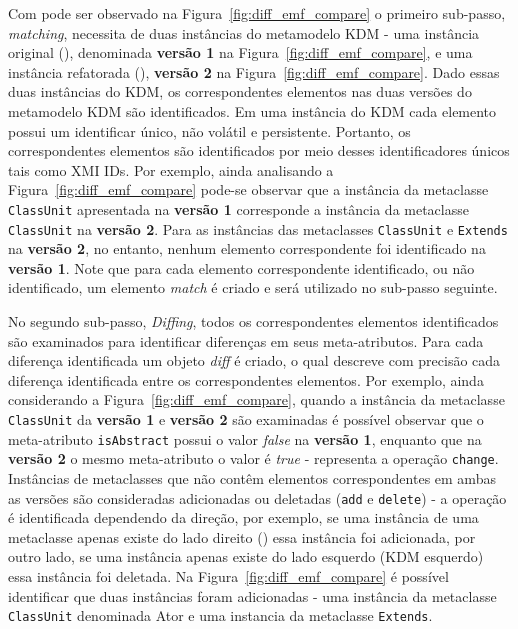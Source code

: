 Com pode ser observado na Figura~\ref{fig:diff_emf_compare} o primeiro sub-passo, \textit{matching}, necessita de duas instâncias do metamodelo KDM - uma instância original (), denominada \textbf{versão 1} na Figura~\ref{fig:diff_emf_compare}, e uma instância refatorada (), \textbf{versão 2} na Figura~\ref{fig:diff_emf_compare}. Dado essas duas instâncias do KDM, os correspondentes elementos nas duas versões do metamodelo KDM são identificados. Em uma instância do KDM cada elemento possui um identificar único, não volátil e persistente. Portanto, os correspondentes elementos são identificados por meio desses identificadores únicos tais como XMI IDs. Por exemplo, ainda analisando a Figura~\ref{fig:diff_emf_compare} pode-se observar que a instância da metaclasse \texttt{ClassUnit}  apresentada na \textbf{versão 1} corresponde a instância da metaclasse \texttt{ClassUnit}  na \textbf{versão 2}. Para as instâncias das metaclasses \texttt{ClassUnit}  e \texttt{Extends} na \textbf{versão 2}, no entanto, nenhum elemento correspondente foi identificado na \textbf{versão 1}. Note que para cada elemento correspondente identificado, ou não identificado, um elemento \textit{match} é criado e será utilizado no sub-passo seguinte.

No segundo sub-passo, \textit{Diffing}, todos os correspondentes elementos identificados são examinados para identificar diferenças em seus meta-atributos. Para cada diferença identificada um objeto \textit{diff} é criado, o qual descreve com precisão cada diferença identificada entre os correspondentes elementos. Por exemplo, ainda considerando a Figura~\ref{fig:diff_emf_compare}, quando a instância da metaclasse \texttt{ClassUnit}  da \textbf{versão 1} e \textbf{versão 2} são examinadas é possível observar que o meta-atributo \texttt{isAbstract} possui o valor \textit{false} na \textbf{versão 1}, enquanto que na \textbf{versão 2} o mesmo meta-atributo o valor é \textit{true} - representa a operação \texttt{change}. Instâncias de metaclasses que não contêm elementos correspondentes em ambas as versões são consideradas adicionadas ou deletadas (\texttt{add} e \texttt{delete}) - a operação é identificada dependendo da direção, por exemplo, se uma instância de uma metaclasse apenas existe do lado direito () essa instância foi adicionada, por outro lado, se uma instância apenas existe do lado esquerdo (KDM esquerdo) essa instância foi deletada. Na Figura~\ref{fig:diff_emf_compare} é possível identificar que duas instâncias foram adicionadas - uma instância da metaclasse \texttt{ClassUnit} denominada Ator e uma instancia da metaclasse \texttt{Extends}.


